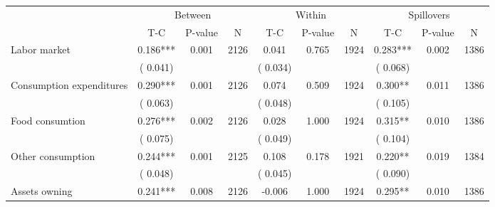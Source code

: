 
\begin{tabular}{l*{9}{c}}\hline&\multicolumn{3}{c}{Between}&\multicolumn{3}{c}{Within}&\multicolumn{3}{c}{Spillovers} \\ \cmidrule(r){2-4}\cmidrule(l){5-7}\cmidrule(l){8-10} & {T-C} & {P-value} & {N} & {T-C} & {P-value} & {N}  & {T-C} & {P-value} & {N}  \\ \midrule
 Labor market                 &              0.186***          &        0.001 & 2126          &              0.041          &        0.765 & 1924          &        0.283*** &        0.002 & 1386                 \\ 
                               &        (       0.041) & &                                                                 &       (       0.034) & &                                                          &       (       0.068)      & &     \\ 
 Consumption expenditures                 &              0.290***          &        0.001 & 2126          &              0.074 &        0.509 & 1924                   &        0.300** &        0.011 & 1386                 \\ 
                               &        (       0.063) & &                                                                 &       (       0.048) & &                                                          &       (       0.105) & &  \\ 
 Food consumtion                 &              0.276***          &        0.002 & 2126          &              0.028 &        1.000 & 1924                   &        0.315** &        0.010 & 1386                 \\ 
                               &        (       0.075) & &                                                                 &       (       0.049) & &                                                          & (       0.104)                                    \\ 
 Other consumption                 &              0.244***          &        0.001 & 2125          &              0.108 &        0.178 & 1921                   &        0.220** &        0.019 & 1384                 \\ 
                               &        (       0.048) & &                                                                 &       (       0.045) & &                                                          &       (       0.090) & &   \\ 
 Assets owning                 &              0.241***          &        0.008 & 2126          &             -0.006 &        1.000 & 1924                   &        0.295** &        0.010 & 1386                 \\ 

\end{tabular}
